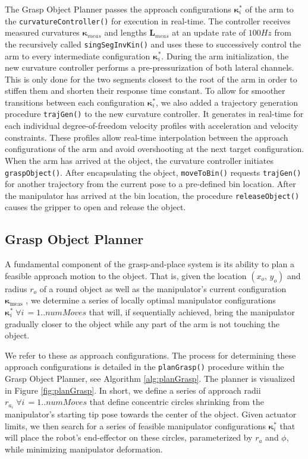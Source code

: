 The Grasp Object Planner passes the approach configurations $\boldsymbol{\kappa}_i^*$ of the arm to the \texttt{curvatureController()} for execution in real-time.
The controller receives measured curvatures $\boldsymbol{\kappa}_{meas}$ and lengths $\boldsymbol{L}_{meas}$ at an update rate of $100\unit{Hz}$ from the recursively called \texttt{singSegInvKin()} and uses these to successively control the arm to every intermediate configuration $\boldsymbol{\kappa}_i^*$.
During the arm initialization, the new curvature controller performs a pre-pressurization of both lateral channels. 
This is only done for the two segments closest to the root of the arm in order to stiffen them and shorten their response time constant.  
To allow for smoother transitions between each configuration $\boldsymbol{\kappa}_i^*$, we also added a trajectory generation procedure \texttt{trajGen()} to the new curvature controller. It generates in real-time for each individual degree-of-freedom velocity profiles with acceleration and velocity constraints.
These profiles allow real-time interpolation between the approach configurations of the arm and avoid overshooting at the next target configuration.
When the arm has arrived at the object, the curvature controller initiates \texttt{graspObject()}.
After encapsulating the object, \texttt{moveToBin()} requests \texttt{trajGen()} for another trajectory from the current pose to a pre-defined bin location.
After the manipulator has arrived at the bin location, the procedure \texttt{releaseObject()} causes the gripper to open and release the object.

\subsection{Grasp Object Planner}
\label{subsec:grasp_planner}
A fundamental component of the grasp-and-place system is its ability to plan a feasible approach motion to the object.
That is, given the location $\left(x_o, \, y_o\right)$ and radius $r_o$ of a round object as well as the manipulator's current configuration $\boldsymbol{\kappa}_{\textrm{meas}}$ , we determine a series of locally optimal manipulator configurations $\boldsymbol{\kappa}_i^* \; \forall i \, = 1.. numMoves$ that will, if sequentially achieved, bring the manipulator gradually closer to the object while any part of the arm is not touching the object.

We refer to these as approach configurations.
The process for determining these approach configurations is detailed in the \texttt{planGrasp()} procedure within the Grasp Object Planner, see Algorithm \ref{alg:planGrasp}.
The planner is visualized in Figure \ref{fig:planGrasp}.
In short, we define a series of approach radii $r_{a_i} \;  \forall i\, = 1.. numMoves$ that define concentric circles shrinking from the manipulator's starting tip pose towards the center of the object.
Given actuator limits, we then search for a series of feasible manipulator configurations $\boldsymbol{\kappa}_i^*$ that will place the robot's end-effector on these  circles, parameterized by $r_a$ and $\phi$, while minimizing manipulator deformation.

